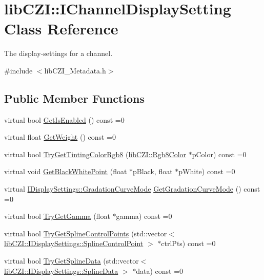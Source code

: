 \hypertarget{classlib_c_z_i_1_1_i_channel_display_setting}{}\section{lib\+C\+ZI\+:\+:I\+Channel\+Display\+Setting Class Reference}
\label{classlib_c_z_i_1_1_i_channel_display_setting}


The display-\/settings for a channel.  




{\ttfamily \#include $<$lib\+C\+Z\+I\+\_\+\+Metadata.\+h$>$}

\subsection*{Public Member Functions}
\begin{DoxyCompactItemize}
\item 
virtual bool \hyperlink{classlib_c_z_i_1_1_i_channel_display_setting_a874cb106b686e6f4b7fad2f6dd1b3eed}{Get\+Is\+Enabled} () const =0
\item 
virtual float \hyperlink{classlib_c_z_i_1_1_i_channel_display_setting_ad4b5a8fed9cad0b28acbbfed7736a8d0}{Get\+Weight} () const =0
\item 
virtual bool \hyperlink{classlib_c_z_i_1_1_i_channel_display_setting_a7fd49b4a914738b4640eedef351cdd02}{Try\+Get\+Tinting\+Color\+Rgb8} (\hyperlink{structlib_c_z_i_1_1_rgb8_color}{lib\+C\+Z\+I\+::\+Rgb8\+Color} $\ast$p\+Color) const =0
\item 
virtual void \hyperlink{classlib_c_z_i_1_1_i_channel_display_setting_a1172fdc6f7c3131d5e6ddf6ab35c6f85}{Get\+Black\+White\+Point} (float $\ast$p\+Black, float $\ast$p\+White) const =0
\item 
virtual \hyperlink{classlib_c_z_i_1_1_i_display_settings_af114dfcc8a603ca1c2fc57bc35c97684}{I\+Display\+Settings\+::\+Gradation\+Curve\+Mode} \hyperlink{classlib_c_z_i_1_1_i_channel_display_setting_abcee850366caccfb3245c84ea6f71287}{Get\+Gradation\+Curve\+Mode} () const =0
\item 
virtual bool \hyperlink{classlib_c_z_i_1_1_i_channel_display_setting_a37a0c8e3159e6a5e3a9cd0c22b90fd2f}{Try\+Get\+Gamma} (float $\ast$gamma) const =0
\item 
virtual bool \hyperlink{classlib_c_z_i_1_1_i_channel_display_setting_ae8a2192fd92015fc6ce59958b598a8cb}{Try\+Get\+Spline\+Control\+Points} (std\+::vector$<$ \hyperlink{structlib_c_z_i_1_1_i_display_settings_1_1_spline_control_point}{lib\+C\+Z\+I\+::\+I\+Display\+Settings\+::\+Spline\+Control\+Point} $>$ $\ast$ctrl\+Pts) const =0
\item 
virtual bool \hyperlink{classlib_c_z_i_1_1_i_channel_display_setting_ae3779bf0fb5b48c8ee3549e2ebb3947f}{Try\+Get\+Spline\+Data} (std\+::vector$<$ \hyperlink{structlib_c_z_i_1_1_i_display_settings_1_1_spline_data}{lib\+C\+Z\+I\+::\+I\+Display\+Settings\+::\+Spline\+Data} $>$ $\ast$data) const =0
\end{DoxyCompactItemize}
